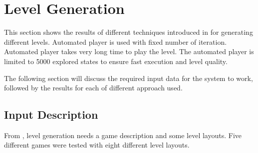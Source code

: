\section{Level Generation}
This section shows the results of different techniques introduced in  for generating different levels. Automated player is used with fixed number of iteration. Automated player takes very long time to play the level. The automated player is limited to 5000 explored states to ensure fast execution and level quality.\\\par

The following section will discuss the required input data for the system to work, followed by the results for each of different approach used.

\subsection{Input Description}
From , level generation needs a game description and some level layouts. Five different games were tested with eight different level layouts.

